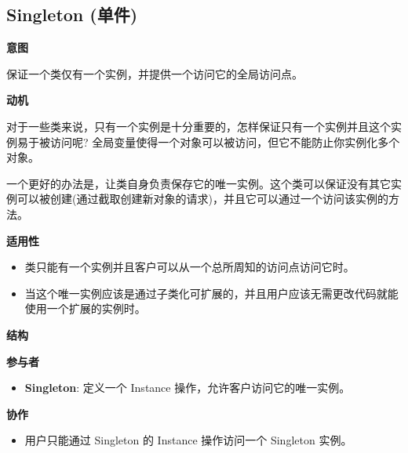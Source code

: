 \subsection{Singleton (单件)}

\noindent\textbf{意图}

保证一个类仅有一个实例，并提供一个访问它的全局访问点。

\noindent\textbf{动机}

对于一些类来说，只有一个实例是十分重要的，怎样保证只有一个实例并且这个实例易于被访问呢? 全局变量使得一个对象可以被访问，但它不能防止你实例化多个对象。

一个更好的办法是，让类自身负责保存它的唯一实例。这个类可以保证没有其它实例可以被创建(通过截取创建新对象的请求)，并且它可以通过一个访问该实例的方法。

\noindent\textbf{适用性}

\begin{itemize}
    \item 类只能有一个实例并且客户可以从一个总所周知的访问点访问它时。
    \item 当这个唯一实例应该是通过子类化可扩展的，并且用户应该无需更改代码就能使用一个扩展的实例时。
\end{itemize}

\noindent\textbf{结构}

\begin{figure}[H]
    \scriptsize
    \centering
\end{figure}

\noindent\textbf{参与者}
\begin{itemize}
    \item \textbf{Singleton}: 定义一个 Instance 操作，允许客户访问它的唯一实例。
\end{itemize}

\noindent\textbf{协作}
\begin{itemize}
    \item 用户只能通过 Singleton 的 Instance 操作访问一个 Singleton 实例。
\end{itemize}

